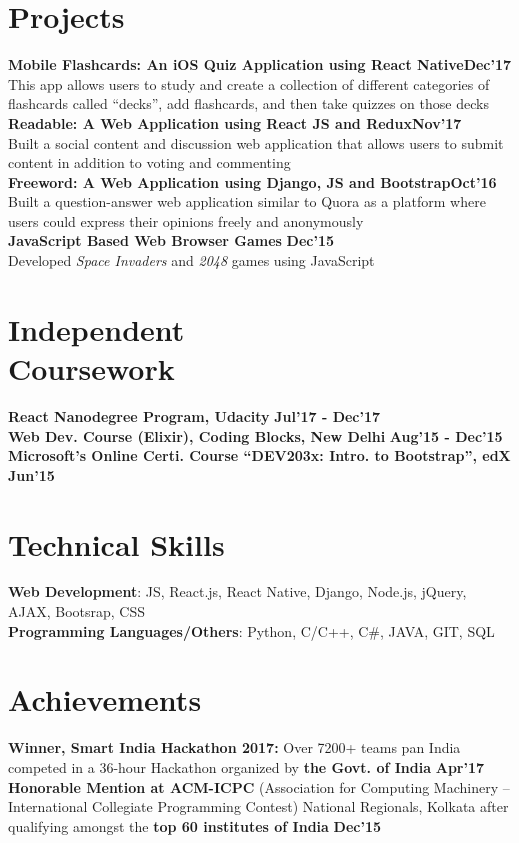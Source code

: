 \documentclass[margin,line]{res}
\begin{document}
\begin{resume}
\section{\sc Projects}
{\bf Mobile Flashcards: An iOS Quiz Application using React Native}\hfill {\bf Dec'17}\\
This app allows users to study and create a collection of different categories of flashcards called “decks”, add
flashcards, and then take quizzes on those decks\\ 
{\bf Readable: A Web Application using React JS and Redux}\hfill {\bf Nov'17}\\
Built a social content and discussion web application that allows users to submit content in addition to voting
and commenting\\
{\bf Freeword: A Web Application using Django, JS and Bootstrap}\hfill {\bf Oct'16}\\
Built a question-answer web application similar to Quora as a platform where users could express their opinions freely and anonymously \\
{\bf JavaScript Based Web Browser Games} \hfill {\bf Dec'15}\\
Developed {\it Space Invaders} and {\it 2048} games using JavaScript 

\section{\sc Independent \\Coursework}
{\bf React Nanodegree Program, Udacity} \hfill {\bf Jul'17 - Dec'17} \\
{\bf Web Dev. Course (Elixir), Coding Blocks, New Delhi} \hfill {\bf Aug'15 - Dec'15} \\
{\bf Microsoft’s Online Certi. Course “DEV203x: Intro. to Bootstrap”, edX} \hfill {\bf Jun'15}

\section{\sc Technical Skills}
{\bf Web Development}: JS, React.js, React Native, Django, Node.js, jQuery, AJAX, Bootsrap, CSS\\
{\bf Programming Languages/Others}: Python, C/C++, C\#, JAVA, GIT, SQL

\section{\sc Achievements}
{\bf Winner, Smart India Hackathon 2017: }Over 7200+ teams pan India competed in a 36-hour Hackathon organized by {\bf the Govt. of India} \hfill {\bf Apr'17} \\
{\bf Honorable Mention at ACM-ICPC} (Association for Computing Machinery – International Collegiate
Programming Contest) National Regionals, Kolkata after qualifying amongst the {\bf top 60 institutes of India} \hfill {\bf Dec'15}

\end{resume}
\end{document}
